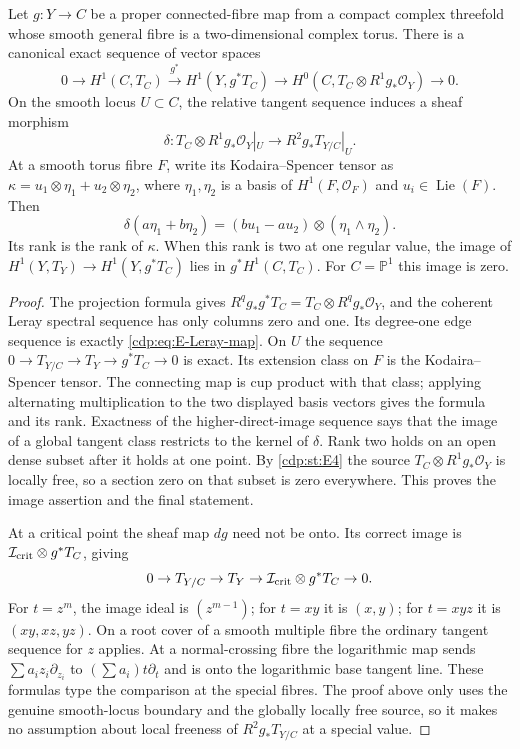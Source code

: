 
\begin{proposition}\label{cdp:st:E5}
Let $g:Y\to C$ be a proper connected-fibre map from a compact complex
threefold whose smooth general fibre is a two-dimensional complex
torus. There is a canonical exact sequence of vector spaces
\begin{equation}\label{cdp:eq:E-Leray-map}
0\to H^1(C,T_C)\xrightarrow{g^*}H^1(Y,g^*T_C)
 \to H^0(C,T_C\otimes R^1g_*\mathcal O_Y)\to0.
\end{equation}
On the smooth locus $U\subset C$, the relative tangent sequence
induces a sheaf morphism
\[
 \delta:T_C\otimes R^1g_*\mathcal O_Y|_U
                  \longrightarrow R^2g_*T_{Y/C}|_U.
\]
At a smooth torus fibre $F$, write its Kodaira--Spencer tensor as
$\kappa=u_1\otimes\eta_1+u_2\otimes\eta_2$, where
$\eta_1,\eta_2$ is a basis of $H^1(F,\mathcal O_F)$ and
$u_i\in\operatorname{Lie}(F)$. Then
\[
 \delta(a\eta_1+b\eta_2)
   =(bu_1-au_2)\otimes(\eta_1\wedge\eta_2).
\]
Its rank is the rank of $\kappa$. When this rank is two at one
regular value, the image of $H^1(Y,T_Y)\to H^1(Y,g^*T_C)$ lies
in $g^*H^1(C,T_C)$. For $C=\mathbb P^1$ this image is zero.
\end{proposition}
\begin{proof}
The projection formula gives
$R^qg_*g^*T_C=T_C\otimes R^qg_*\mathcal O_Y$, and the coherent
Leray spectral sequence has only columns zero and one. Its
degree-one edge sequence is exactly \eqref{cdp:eq:E-Leray-map}.
On $U$ the sequence
$0\to T_{Y/C}\to T_Y\to g^*T_C\to0$ is exact. Its extension
class on $F$ is the Kodaira--Spencer tensor. The connecting map is
cup product with that class; applying alternating multiplication to
the two displayed basis vectors gives the formula and its rank.
Exactness of the higher-direct-image sequence says that the image
of a global tangent class restricts to the kernel of $\delta$.
Rank two holds on an open dense subset after it holds at one point.
By \ref{cdp:st:E4} the source $T_C\otimes R^1g_*\mathcal O_Y$ is locally free,
so a section zero on that subset is zero everywhere. This proves
the image assertion and the final statement.

At a critical point the sheaf map $dg$ need not be onto. Its correct
image is $\mathcal I_{\rm crit}\otimes g^*T_C$, giving
\[
0\to T_{Y/C}\to T_Y\to
 \mathcal I_{\rm crit}\otimes g^*T_C\to0.
\]
For $t=z^m$, the image ideal is $(z^{m-1})$; for $t=xy$ it is
$(x,y)$; for $t=xyz$ it is $(xy,xz,yz)$. On a root cover of a
smooth multiple fibre the ordinary tangent sequence for $z$ applies.
At a normal-crossing fibre the logarithmic map sends
$\sum a_i z_i\partial_{z_i}$ to
$(\sum a_i)t\partial_t$ and is onto the logarithmic base tangent
line. These formulas type the comparison at the special fibres.
The proof above only uses the genuine smooth-locus boundary and
the globally locally free source, so it makes no assumption about
local freeness of $R^2g_*T_{Y/C}$ at a special value.
\end{proof}


